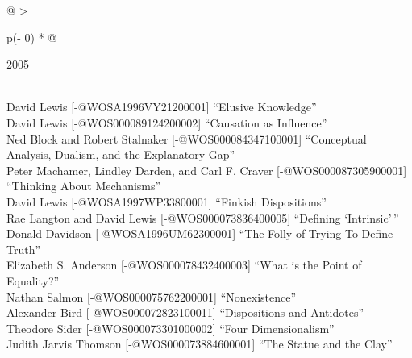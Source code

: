 \documentclass[
  10pt,
  letterpaper,
  DIV=11,
  numbers=noendperiod,
  twoside]{scrartcl}
\begin{document}
\begin{longtable}[]{@{}
  >{\raggedright\arraybackslash}p{(\columnwidth - 0\tabcolsep) * }@{}}

\caption{\label{tbl-top-ten-1996}Most cited articles published less than
ten years ago as of 2005.}

\tabularnewline

\toprule\noalign{}
\begin{minipage}[b]{\linewidth}\raggedright
2005
\end{minipage} \\
\midrule\noalign{}
\endhead
\bottomrule\noalign{}
\endlastfoot
David Lewis {[}-@WOSA1996VY21200001{]} ``Elusive Knowledge'' \\
David Lewis {[}-@WOS000089124200002{]} ``Causation as Influence'' \\
Ned Block and Robert Stalnaker {[}-@WOS000084347100001{]} ``Conceptual
Analysis, Dualism, and the Explanatory Gap'' \\
Peter Machamer, Lindley Darden, and Carl F. Craver
{[}-@WOS000087305900001{]} ``Thinking About Mechanisms'' \\
David Lewis {[}-@WOSA1997WP33800001{]} ``Finkish Dispositions'' \\
Rae Langton and David Lewis {[}-@WOS000073836400005{]} ``Defining
`Intrinsic'\,'' \\
Donald Davidson {[}-@WOSA1996UM62300001{]} ``The Folly of Trying To
Define Truth'' \\
Elizabeth S. Anderson {[}-@WOS000078432400003{]} ``What is the Point of
Equality?'' \\
Nathan Salmon {[}-@WOS000075762200001{]} ``Nonexistence'' \\
Alexander Bird {[}-@WOS000072823100011{]} ``Dispositions and
Antidotes'' \\
Theodore Sider {[}-@WOS000073301000002{]} ``Four Dimensionalism'' \\
Judith Jarvis Thomson {[}-@WOS000073884600001{]} ``The Statue and the
Clay'' \\

\end{longtable}
\end{document}

